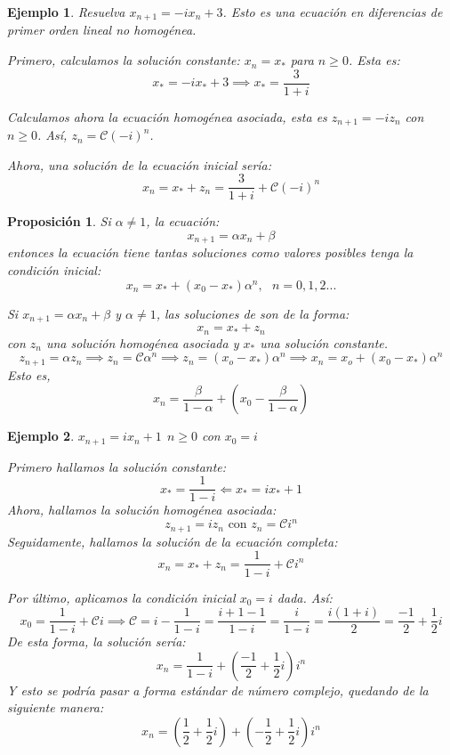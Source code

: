 \documentclass[11pt, a4paper, titlepage]{article}
\makeatletter
\renewenvironment{proof}[1][\proofname] {\vspace{-15pt}\par\pushQED{\qed}\normalfont\topsep6\p@\@plus6\p@\relax\trivlist\item[\hskip\labelsep\it#1\@addpunct{.}]\ignorespaces}{\popQED\endtrivlist\@endpefalse}
\theoremstyle{theorem-style}
\newtheorem*{nprop}{Proposición}
\theoremstyle{definition-style}
\theoremstyle{remark-style}
\theoremstyle{example-style}
\newtheorem*{ejemplo}{Ejemplo}
\makeatother
\begin{document}
\begin{ejemplo}
	Resuelva $x_{n+1} = -ix_n + 3$. Esto es una ecuación en diferencias de primer orden lineal no homogénea.
	\begin{proof}[Solución]
	Primero, calculamos la solución constante: $x_n = x_*$ para $n \geq 0$. Esta es:
	\[
	x_* = -i x_* +3 \implies x_* = \frac{3}{1+i}
	\]
	
	Calculamos ahora la ecuación homogénea asociada, esta es $z_{n+1} = -iz_n$ con $n \geq 0$. Así, $z_n =  \mathcal{C}(-i)^n$.
	
	Ahora, una solución de la ecuación inicial sería:
	\[
	x_n =  x_* +z_n = \frac{3}{1+i}+\mathcal{C}(-i)^n
	\]
\end{proof}

\end{ejemplo}

\begin{nprop}
	Si $\alpha \ne 1$, la ecuación:
	\[
	x_{n+1} = \alpha x_n + \beta
	\]
	entonces la ecuación tiene tantas soluciones como valores posibles tenga la condición inicial:
	\[
	x_n = x_* + (x_0-x_*)\alpha^n , \ \ \ n=0,1,2...
	\]
	
	\begin{proof}
	Si $x_{n+1} = \alpha x_n + \beta$ y $\alpha \ne 1$, las soluciones de son de la forma:
	\[
	x_n = x_*+z_n 
	\]
	con $z_n$ una solución homogénea asociada y $x_*$ una solución constante.
	\[
	z_{n+1} = \alpha z_n \implies z_{n} = \mathcal{C}\alpha^n \implies z_n = (x_o - x_*)\alpha^n \implies x_n = x_o + (x_0 - x_*)\alpha^n
	\]
	Esto es, 
	$$x_n = \frac{\beta}{1-\alpha}+\left(x_0- \frac{\beta}{1-\alpha}\right)$$
\end{proof}

\end{nprop}


\begin{ejemplo}
	$x_{n+1}=ix_n+1 \ \ n \geq 0$ con $x_0=i$
	\begin{proof}[Solución]
	Primero hallamos la solución constante:
	\[
	x_* = \frac{1}{1-i} \Leftarrow x_* = ix_* +1
	\]
	Ahora, hallamos la solución homogénea asociada:
	\[
	z_{n+1} = iz_n \text{ con $z_n = \mathcal{C}i^n$}
	\]
	Seguidamente, hallamos la solución de la ecuación completa:
	\[
	x_n = x_* + z_n = \frac{1}{1-i}+ \mathcal{C}i^n
	\]
	
	Por último, aplicamos la condición inicial $x_0=i$ dada. Así:
	\[
	x_0 = \frac{1}{1-i}+ \mathcal{C}i \implies \mathcal{C} = i-\frac{1}{1-i} =  \frac{i+1-1}{1-i} = \frac{i}{1-i} = \frac{i(1+i)}{2} = \frac{-1}{2}+ \frac{1}{2}i
	\]
	De esta forma, la solución sería:
	\[
	x_n = \frac{1}{1-i} + \left(\frac{-1}{2}+ \frac{1}{2}i\right)i^n
	\]
	Y esto se podría pasar a forma estándar de número complejo, quedando de la siguiente manera:
	$$x_n=\left(\frac{1}{2} + \frac{1}{2}i\right) + \left(-\frac{1}{2} + \frac{1}{2}i\right)i^n$$
\end{proof}
\end{ejemplo}
\end{document}
